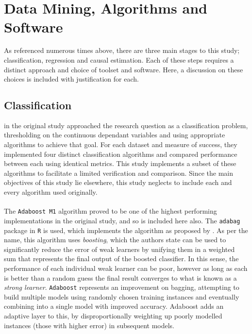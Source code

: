 {\section{Data Mining, Algorithms and Software}
{As referenced numerous times above, there are three main stages to this study; classification, regression and causal estimation. Each of these steps requires a distinct approach and choice of toolset and software. Here, a discussion on these choices is included with justification for each.}
\subsection{Classification}\label{methodClass}
{\cite{moldovan2015learning} in the original study approached the research question as a classification problem, thresholding on the continuous dependant variables and using appropriate algorithms to achieve that goal. For each dataset and measure of success, they implemented four distinct classification algorithms and compared performance between each using identical metrics. This study implements a subset of these algorithms to facilitate a limited verification and comparison. Since the main objectives of this study lie elsewhere, this study neglects to include each and every algorithm used originally.   \\\\
The \texttt{Adaboost M1} algorithm proved to be one of the highest performing implementations in the original study, and so is included here also. The \texttt{adabag} package in \texttt{R} is used, which implements the algorithm as proposed by \cite{freundAdaboost}. As per the name, this algorithm uses {\it boosting}, which the authors state can be used to significantly reduce the error of weak learners by unifying them in a weighted sum that represents the final output of the boosted classifier. In this sense, the performance of each individual weak learner can be poor, however as long as each is better than a random guess the final result converges to what is known as a {\it strong learner}. \texttt{Adaboost} represents an improvement on bagging, attempting to build multiple models using randomly chosen training instances and eventually combining into a single model with improved accuracy. Adaboost adds an adaptive layer to this, by disproportionally weighting up poorly modelled instances (those with higher error) in subsequent models.} \\\\
}
